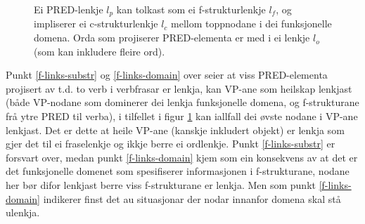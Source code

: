 \documentclass[11pt,a4paper,oneside,draft]{book}
\begin{document}
 \begin{figure}[htp]
    \centering
    

    \caption{Ei PRED-lenkje $l_p$ kan tolkast som ei f-strukturlenkje
    $l_f$, og impliserer ei c-strukturlenkje $l_c$ mellom toppnodane i
    dei funksjonelle domena. Orda som projiserer PRED-elementa er med
    i ei lenkje $l_o$ (som kan inkludere fleire ord).}
   \label{fig:viss-PRED-så-f-og-c}
 \end{figure}

Punkt \ref{f-links-substr} og \ref{f-links-domain} over seier at viss
PRED-elementa projisert av t.d. to verb i verbfrasar er lenkja, kan
VP-ane som heilskap lenkjast (både VP-nodane som dominerer dei lenkja
funksjonelle domena, og f-strukturane frå ytre PRED til verba), i
tilfellet i figur \ref{fig:viss-PRED-så-f-og-c} kan iallfall dei øvste
nodane i VP-ane lenkjast.  Det er dette at heile VP-ane (kanskje
inkludert objekt) er lenkja som gjer det til ei fraselenkje og ikkje
berre ei ordlenkje. Punkt \ref{f-links-substr} er forsvart over, medan
punkt \ref{f-links-domain} kjem som ein konsekvens av at det er det
funksjonelle domenet som spesifiserer informasjonen i f-strukturane,
nodane her bør difor lenkjast berre viss f-strukturane er lenkja. Men
som punkt \ref{f-links-domain} indikerer finst det au situasjonar der
nodar innanfor domena skal stå ulenkja.
\end{document}
